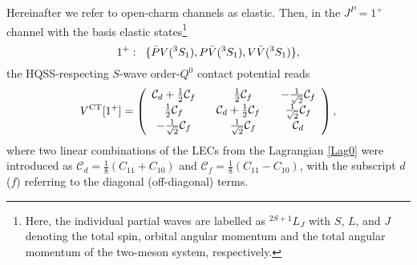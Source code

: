\documentclass[preprint,12pt,3p]{elsarticle}
\newcommand{\be}{\begin{equation}}
\newcommand{\ee}{\end{equation}}
\begin{document}
Hereinafter we refer to open-charm channels as elastic. Then, in the $J^P=1^+$ channel
with the basis elastic states\footnote{Here, the individual partial waves are labelled as $^{2S+1}L_J$ with $S$, $L$, and $J$ denoting the total
spin, orbital angular momentum and the total angular momentum of the two-meson system, respectively.} 
\be
1^+:\hspace*{0.2cm}\{\bar{P}V(^3S_1),P\bar{V}(^3S_1),V\bar{V}(^3S_1)\},
\label{1p}
\ee
the HQSS-respecting $S$-wave order-$Q^0$ contact potential reads
\be
V^{\rm CT}[1^+]=\left(
\begin{array}{cccccc}
\mathcal{C}_d+\frac12\mathcal{C}_f \hspace{0.3cm} & \frac12\mathcal{C}_f & -\frac1{\sqrt2}\mathcal{C}_f \\
\frac12\mathcal{C}_f \hspace{0.3cm} & \mathcal{C}_d+\frac12\mathcal{C}_f \hspace{0.3cm} & \frac1{\sqrt2}\mathcal{C}_f \\
-\frac1{\sqrt2}\mathcal{C}_f\hspace{0.3cm} & \frac1{\sqrt2}\mathcal{C}_f & \mathcal{C}_d
\end{array}\right),
\label{v3x3}
\ee
where two linear combinations of the LECs from the Lagrangian \eqref{Lag0} were introduced as 
$\mathcal{C}_d=\frac18(C_{11}+C_{10})$ and
$\mathcal{C}_f=\frac18(C_{11}-C_{10})$, with the subscript $d$ ($f$)
referring to the diagonal (off-diagonal) terms. 
\end{document}
